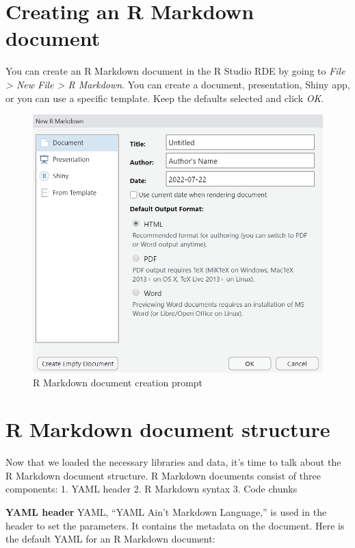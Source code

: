 \documentclass[
  krantz2]{krantz}
\begin{document}
\hypertarget{creating-an-r-markdown-document}{%
\section{Creating an R Markdown document}\label{creating-an-r-markdown-document}}

You can create an R Markdown document in the R Studio RDE by going to \emph{File \textgreater{} New File \textgreater{} R Markdown}. You can create a document, presentation, Shiny app, or you can use a specific template. Keep the defaults selected and click \emph{OK}.

\begin{figure}
\centering
\includegraphics{images/rmarkdown_doc_prompt.png}
\caption{R Markdown document creation prompt}
\end{figure}

\hypertarget{r-markdown-document-structure}{%
\section{R Markdown document structure}\label{r-markdown-document-structure}}

Now that we loaded the necessary libraries and data, it's time to talk about the R Markdown document structure. R Markdown documents consist of three components:
1. YAML header
2. R Markdown syntax
3. Code chunks

\textbf{YAML header}
YAML, ``YAML Ain't Markdown Language,'' is used in the header to set the parameters. It contains the metadata on the document. Here is the default YAML for an R Markdown document:
\end{document}
